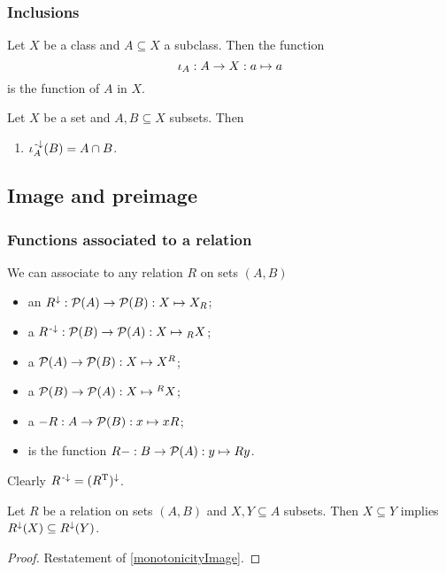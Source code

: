 \subsubsection{Inclusions}
\begin{definition}
Let $X$ be a class and $A\subseteq X$ a subclass. Then the function
\[ \operatorname{\iota}_A: A\to X: a\mapsto a \]
is the  function of $A$ in $X$.
\end{definition}

\begin{lemma}
Let $X$ be a set and $A,B\subseteq X$ subsets. Then
\begin{enumerate}
\item $\operatorname{\iota}_A^{\text{\hspace{0.15em}-}\downarrow}(B) = A\cap B$.
\end{enumerate}
\end{lemma}

\subsection{Image and preimage}
\subsubsection{Functions associated to a relation}
We can associate to any relation $R$ on sets $(A,B)$
\begin{itemize}
\item an  $R^{\downarrow}: \operatorname{\mathcal{P}}(A) \to \operatorname{\mathcal{P}}(B): X \mapsto X_R$;
\item a  $R^{{\text{\hspace{0.15em}-}\downarrow}}: \operatorname{\mathcal{P}}(B) \to \operatorname{\mathcal{P}}(A): X \mapsto {_RX}$;
\item a  $\operatorname{\mathcal{P}}(A) \to \operatorname{\mathcal{P}}(B): X \mapsto X^R$;
\item a  $\operatorname{\mathcal{P}}(B) \to \operatorname{\mathcal{P}}(A): X \mapsto {^RX}$;
\item a  $-R: A\to \operatorname{\mathcal{P}}(B): x \mapsto xR$;
\item {} is the function $R-: B\to \operatorname{\mathcal{P}}(A): y \mapsto Ry$.
\end{itemize}

Clearly $R^{{\text{\hspace{0.15em}-}\downarrow}} = (R^{\mathrm{T}})^\downarrow$.

\begin{lemma}
Let $R$ be a relation on sets $(A,B)$ and $X, Y \subseteq A$ subsets. Then $X\subseteq Y$ implies $R^\downarrow(X) \subseteq R^\downarrow(Y)$.
\end{lemma}
\begin{proof}
Restatement of \ref{monotonicityImage}.
\end{proof}

